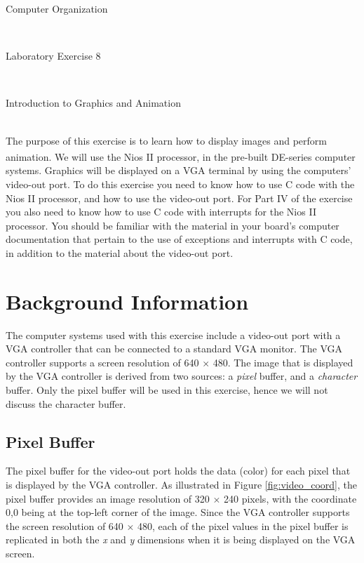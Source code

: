 \documentclass[epsfig,10pt,fullpage]{article}
\newcommand{\LabNum}{8}
\begin{document}
\centerline{\huge Computer Organization}
~\\
\centerline{\huge Laboratory Exercise \LabNum}
~\\
\centerline{\large Introduction to Graphics and Animation}
~\\

The purpose of this exercise is to learn how to display images and perform animation. We will 
use the Nios\textsuperscript{\textregistered} II processor, in the pre-built DE-series computer systems. Graphics will be displayed 
on a VGA terminal by using the computers' video-out port. To do this exercise you 
need to know how to use C code with the Nios II processor, and how to use the video-out port.
For Part IV of the exercise you also need to know how to use C code with interrupts
for the Nios II processor.  You should be familiar with the 
material in your board's computer documentation that pertain to the use of exceptions and 
interrupts with C code, in addition to the material about the video-out port.

\section*{Background Information}
The computer systems used with this exercise include a video-out port with a VGA
controller that can be connected to a standard VGA monitor. The VGA controller supports
a screen resolution of 640 $\times$ 480. The image that is displayed by the VGA controller is
derived from two sources: a {\it pixel} buffer, and a {\it character} buffer. Only the
pixel buffer will be used in this exercise, hence we will not discuss the character buffer.

\subsection*{Pixel Buffer}
\label{sec:pixel_buffer}
The pixel buffer for the video-out port holds the data (color) for each pixel that is 
displayed by the VGA controller.  As illustrated in Figure \ref{fig:video_coord}, the
pixel buffer provides an image resolution of 
320 $\times$ 240 pixels, with the coordinate 0,0 being at the top-left corner of the image. 
Since the VGA controller supports the screen resolution of 640 $\times$ 480, each of the
pixel values in
the pixel buffer is replicated in both the {\it x} and {\it y} dimensions when it is being
displayed on the VGA screen.
\end{document}
